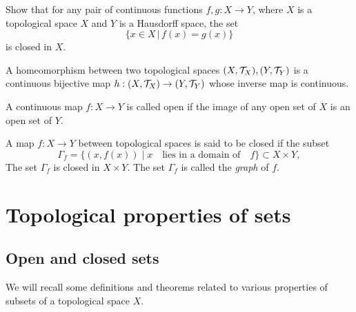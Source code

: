\begin{ex}\label{Ex:cont}
Show that for any pair of continuous functions $f,g:X\to Y$, where $X$ is a topological space $X$ and $Y$ is a Hausdorff space,
the set
    \[\{x\in X \,|\, f(x)=g(x)\} \]
    is closed in $X$. 
\end{ex}

\begin{definition}[{\bf Homeomorphism}]
A homeomorphism between two topological spaces $(X,\mathcal{T}_{X}), (Y,\mathcal{T}_{Y})$ is a continuous bijective map $h :(X,\mathcal{T}_{X})\to (Y,\mathcal{T}_{Y})$ whose inverse map is continuous.
\end{definition}

\begin{definition}
A continuous map $f: X\to Y$ is called open if the image of any open set of $X$ is an open set of $Y$.
\end{definition}

\begin{definition}
A map $f:X\to Y$ between topological spaces is said to be closed if the subset 
\[
\Gamma_f=\{(x,f(x)) \mid x\quad \text{lies in a domain of}\quad  f\}\subset X\times Y,
\] 
The set $\Gamma_f$ is closed in $X\times Y$. The set $\Gamma_f$ is called the \emph{graph} of $f$.
\end{definition}


\section{Topological properties of sets}\label{S:topProp}

\subsection{Open and closed sets}
We will recall some definitions and theorems related to various properties of subsets of a topological space $X$.

